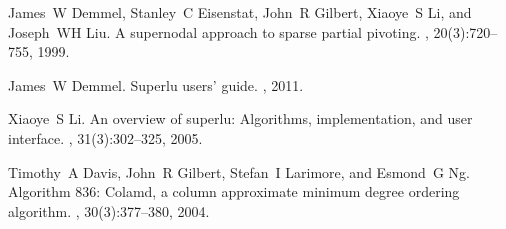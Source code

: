 \documentclass[times]{nlaauth}
\begin{document}
\begin{thebibliography}{10}
James~W Demmel, Stanley~C Eisenstat, John~R Gilbert, Xiaoye~S Li, and Joseph~WH
  Liu.
\newblock A supernodal approach to sparse partial pivoting.
,
  20(3):720--755, 1999.

James~W Demmel.
\newblock Superlu users' guide.
, 2011.

Xiaoye~S Li.
\newblock An overview of superlu: Algorithms, implementation, and user
  interface.
,
  31(3):302--325, 2005.

Timothy~A Davis, John~R Gilbert, Stefan~I Larimore, and Esmond~G Ng.
\newblock Algorithm 836: Colamd, a column approximate minimum degree ordering
  algorithm.
,
  30(3):377--380, 2004.

\end{thebibliography}
\end{document}
